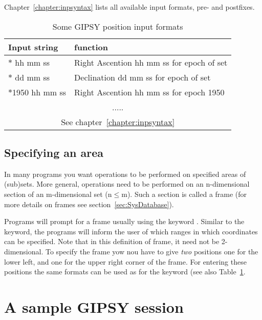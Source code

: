 Chapter~\ref{chapter:inpsyntax} lists all available input formats, pre- and
postfixes.

\begin{table}
\begin{center}
\begin{tabular}{ | l l | }
\hline
Input string  & function \\
\hline
$\ast$ hh mm ss & Right Ascention hh mm ss for epoch of set\\
$\ast$ dd mm ss & Declination dd mm ss  for epoch of set \\
$\ast$1950 hh mm ss & Right Ascention hh mm ss for epoch 1950 \\
\multicolumn{2}{|c|}{.....} \\
\multicolumn{2}{|c|}{See chapter~\ref{chapter:inpsyntax}} \\
\hline
\end{tabular}

\label{tab:GoInputs}

\caption{Some GIPSY position input formats}

\end{center}
\end{table}

\subsection{Specifying an area}

In many programs you want operations to be performed on specified areas
of (sub)sets.  More general, operations need to be performed on an
n-dimensional section of an m-dimensional set (n$\le$m).  Such a
section is called a frame (for more details on frames see
section~\ref{sec:SysDatabase}). 

Programs will prompt for a frame usually using the keyword
.  Similar to the  keyword, the programs
will inform the user of which ranges in which coordinates can be
specified.  Note that in this definition of frame, it need not be
2-dimensional.  To specify the frame yow nou have to give {\em two}
positions one for the lower left, and one for the upper right corner of
the frame.  For entering these positions the same formats can be used as
for the  keyword (see also Table~\ref{tab:GoInputs}. 

\section{A sample GIPSY session}

